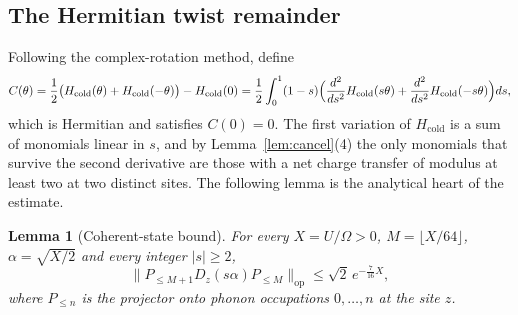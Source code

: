 \documentclass[11pt]{article}
\theoremstyle{plain}
\newtheorem{lemma}{Lemma}
\theoremstyle{definition}
\begin{document}
\subsection{The Hermitian twist remainder}

Following the complex-rotation method, define
\begin{equation}\label{eq:C}
C(\theta)=\frac12\bigl(H_{\mathrm{cold}}(\theta)+H_{\mathrm{cold}}(-\theta)\bigr)-H_{\mathrm{cold}}(0)
=\frac12\int_0^1(1-s)\Bigl(\frac{d^2}{ds^2}H_{\mathrm{cold}}(s\theta)+\frac{d^2}{ds^2}H_{\mathrm{cold}}(-s\theta)\Bigr)ds ,
\end{equation}
which is Hermitian and satisfies $C(0)=0$. The first variation of
$H_{\mathrm{cold}}$ is a sum of monomials linear in $s$, and by
Lemma~\ref{lem:cancel}(4) the only monomials that survive the second derivative
are those with a net charge transfer of modulus at least two at two distinct
sites. The following lemma is the analytical heart of the estimate.

\begin{lemma}[Coherent-state bound]\label{lem:bf}
For every $X=U/\Omega>0$, $M=\lfloor X/64\rfloor$, $\alpha=\sqrt{X/2}$ and every
integer $|s|\ge2$,
\begin{equation}\label{eq:bf}
\bigl\|P_{\le M+1}D_z(s\alpha)P_{\le M}\bigr\|_{\mathrm{op}}\le\sqrt2\,e^{-\frac{7}{16}X},
\end{equation}
where $P_{\le n}$ is the projector onto phonon occupations $0,\dots,n$ at the
site $z$.
\end{lemma}
\end{document}
